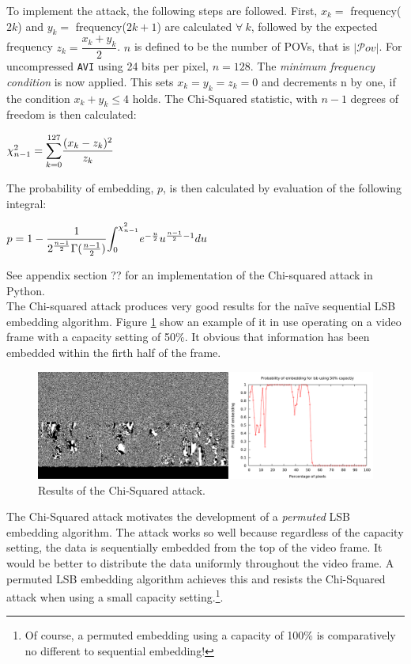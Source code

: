 \documentclass[paper=a4, fontsize=11pt,twoside]{scrartcl}    %
\numberwithin{table}{section}
\numberwithin{figure}{section}
\numberwithin{algorithm}{section}
\begin{document}
To implement the attack, the following steps are followed. First, $x_{k} =$ frequency($2k$) and $y_{k} =$ frequency($2k+1$) are calculated $\forall ~k$, followed by the expected frequency $z_{k} = \dfrac{x_{k} + y_{k}}{2}$. $n$ is defined to be the number of POVs, that is $\vert \mathcal{P}ov \vert$. For uncompressed \texttt{AVI} using 24 bits per pixel, $n=128$. The \textit{minimum frequency condition} is now applied. This sets $x_{k} = y_{k} = z_{k} = 0$ and decrements n by one, if the condition $x_{k} + y_{k} \leq 4$ holds. The Chi-Squared statistic, with $n - 1$ degrees of freedom is then calculated:
\begin{center}
$\chi ^{2} _{n-1} = \mathlarger{\sum}\limits_{k=0}^{127} \dfrac{(x_{k} - z_{k})^2}{z_{k}}$
\end{center}

\noindent
The probability of embedding, $p$, is then calculated by evaluation of the following integral:
\begin{center}
$p = 1 - \dfrac{1}{2^{\frac{n-1}{2}} \Gamma (\frac{n-1}{2})} \mathlarger{\int}_{0}^{\chi ^{2} _{n-1}} e^{-\frac{u}{2}}u^{\frac{n-1}{2}-1} du$
\end{center}

\noindent
See appendix section ?? for an implementation of the Chi-squared attack in Python.\\

\noindent
The Chi-squared attack produces very good results for the na\"ive sequential LSB embedding algorithm. Figure \ref{chi} show an example of it in use operating on a video frame with a capacity setting of 50\%. It obvious that information has been embedded within the firth half of the frame.\\

\begin{figure}[here]
\centerline{\includegraphics[width=\textwidth]{images/chi_graph.png}}
\caption{Results of the Chi-Squared attack.}
\label{chi}
\end{figure}

\noindent
The Chi-Squared attack motivates the development of a \textit{permuted} LSB embedding algorithm. The attack works so well because regardless of the capacity setting, the data is sequentially embedded from the top of the video frame. It would be better to distribute the data uniformly throughout the video frame. A permuted LSB embedding algorithm achieves this and resists the Chi-Squared attack when using a small capacity setting.\footnote{Of course, a permuted embedding using a capacity of 100\% is comparatively no different to sequential embedding!}.
\end{document}
